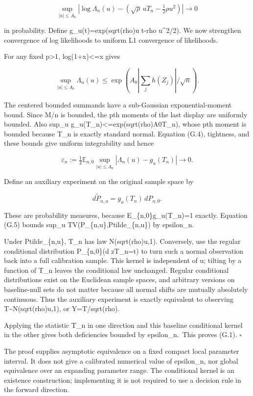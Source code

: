 \[
\sup_{|u|\le A_0}
\left|\log\Lambda_n(u)-\left(\sqrt\rho\,uT_n-\tfrac12\rho u^2\right)\right|
\longrightarrow0
\tag{G.4}
\]

in probability. Define g\_u(t)=exp(sqrt(rho)u t-rho u\^{}2/2). We now
strengthen convergence of log likelihoods to uniform L1 convergence of
likelihoods.

For any fixed p\textgreater1, log(1+x)\textless=x gives

\[
\sup_{|u|\le A_0}\Lambda_n(u)
\le\exp\left(A_0\left|\sum_jh(Z_j)\right|/\sqrt n\right).
\]

The centered bounded summands have a sub-Gaussian exponential-moment
bound. Since M/n is bounded, the pth moments of the last display are
uniformly bounded. Also sup\_u
g\_u(T\_n)\textless=exp(sqrt(rho)A0\textbar T\_n\textbar), whose pth
moment is bounded because T\_n is exactly standard normal. Equation
(G.4), tightness, and these bounds give uniform integrability and hence

\[
\varepsilon_n:=\tfrac12\mathbb E_{n,0}
\sup_{|u|\le A_0}|\Lambda_n(u)-g_u(T_n)|\longrightarrow0.
\tag{G.5}
\]

Define an auxiliary experiment on the original sample space by

\[
d\widetilde P_{n,u}=g_u(T_n)\,dP_{n,0}.
\]

These are probability measures, because E\_\{n,0\}g\_u(T\_n)=1 exactly.
Equation (G.5) bounds sup\_u TV(P\_\{n,u\},Ptilde\_\{n,u\}) by
epsilon\_n.

Under Ptilde\_\{n,u\}, T\_n has law N(sqrt(rho)u,1). Conversely, use the
regular conditional distribution P\_\{n,0\}(d z\textbar T\_n=t) to turn
such a normal observation back into a full calibration sample. This
kernel is independent of u; tilting by a function of T\_n leaves the
conditional law unchanged. Regular conditional distributions exist on
the Euclidean sample spaces, and arbitrary versions on baseline-null
sets do not matter because all normal shifts are mutually absolutely
continuous. Thus the auxiliary experiment is exactly equivalent to
observing T\textasciitilde N(sqrt(rho)u,1), or Y=T/sqrt(rho).

Applying the statistic T\_n in one direction and this baseline
conditional kernel in the other gives both deficiencies bounded by
epsilon\_n.~This proves (G.1). \(\square\)

The proof supplies asymptotic equivalence on a fixed compact local
parameter interval. It does not give a calibrated numerical value of
epsilon\_n, nor global equivalence over an expanding parameter range.
The conditional kernel is an existence construction; implementing it is
not required to use a decision rule in the forward direction.

